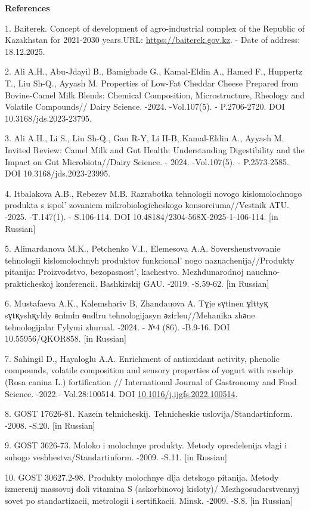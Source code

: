 \begin{center}
{\bfseries References}
\end{center}

\begin{refs}
1. Baiterek. Concept of development of agro-industrial complex of the
Republic of Kazakhstan for 2021-2030
years.URL: \href{https://baiterek.gov.kz/en/programs/concept-of-development-of-agro-industrial-complex-of-the-republic-of-kazakhstan-for-2021-2030-years}{https://baiterek.gov.kz}.
- Date of address: 18.12.2025.

2. Ali A.H., Abu-Jdayil B., Bamigbade G., Kamal-Eldin A., Hamed F.,
Huppertz T., Liu Sh-Q., Ayyash M. Properties of Low-Fat Cheddar Cheese
Prepared from Bovine-Camel Milk Blends: Chemical Composition,
Microstructure, Rheology and Volatile Compounds// Dairy Science. -2024.
-Vol.107(5). - P.2706-2720. DOI 10.3168/jds.2023-23795.

3. Ali A.H., Li S., Liu Sh-Q., Gan R-Y, Li H-B, Kamal-Eldin A., Ayyash
M. Invited Review: Camel Milk and Gut Health: Understanding
Digestibility and the Impact on Gut Microbiota//Dairy Science. - 2024.
-Vol.107(5). - P.2573-2585. DOI 10.3168/jds.2023-23995.

4. Itbalakova A.B., Rebezev M.B. Razrabotka tehnologii novogo
kislomolochnogo produkta s ispol' zovaniem
mikrobiologicheskogo konsorciuma//Vestnik ATU. -2025. -T.147(1). -
S.106-114. DOI 10.48184/2304-568X-2025-1-106-114. {[}in Russian{]}

5. Alimardanova M.K., Petchenko V.I., Elemesova A.A. Sovershenstvovanie
tehnologii kislomolochnyh produktov funkcional' nogo
naznachenija//Produkty pitanija: Proizvodstvo,
bezopasnost', kachestvo. Mezhdunarodnoj
nauchno-prakticheskoj konferencii. Bashkirskij GAU. -2019. -S.59-62.
{[}in Russian{]}

6. Mustafaeva A.K., Kalemshariv B, Zhandauova A. Tүje sүtіnen ұlttyқ
sүtқyshқyldy өnіmіn өndіru tehnologijasyn әzіrleu//Mehanika zhәne
tehnologijalar Ғylymi zhurnal. -2024. - №4 (86). -B.9-16. DOI
10.55956/QKOR858. {[}in Russian{]}

7. Sahingil D., Hayaloglu A.A. Enrichment of antioxidant activity,
phenolic compounds, volatile composition and sensory properties of
yogurt with rosehip (Rosa canina L.) fortification // International
Journal of Gastronomy and Food Science. -2022.- Vol.28:100514. DOI
\href{https://doi.org/10.1016/j.ijgfs.2022.100514}{10.1016/j.ijgfs.2022.100514}.

8. GOST 17626-81. Kazein tehnicheskij. Tehnicheskie
uslovija/Standartinform. -2008. -S.20. {[}in Russian{]}

9. GOST 3626-73. Moloko i molochnye produkty. Metody opredelenija vlagi
i suhogo veshhestva/Standartinform. -2009. -S.11. {[}in Russian{]}

10. GOST 30627.2-98. Produkty molochnye dlja detskogo pitanija. Metody
izmerenij massovoj doli vitamina S (askorbinovoj kisloty)/
Mezhgosudarstvennyj sovet po standartizacii, metrologii i sertifikacii.
Minsk. -2009. -S.8. {[}in Russian{]}
\end{refs}

